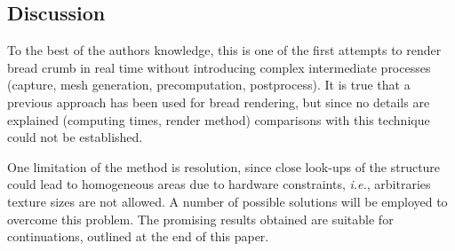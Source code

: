 \documentclass[oneside,a4paper,english,links]{amca}
\begin{document}
\subsection{Discussion}
To the best of the authors knowledge, this is one of the first attempts to render bread crumb in real time without introducing complex intermediate processes (capture, mesh generation, precomputation, postprocess). It is true that a previous approach \citep{Cho2007} has been used for bread rendering, but since no details are explained (computing times, render method) comparisons with this technique could not be established.

One limitation of the method is resolution, since close look-ups of the structure could lead to homogeneous areas due to hardware constraints, {\em i.e.}, arbitraries texture sizes are not allowed. A number of possible solutions will be employed to overcome this problem. The promising results obtained are suitable for continuations, outlined at the end of this paper.









\end{document}
